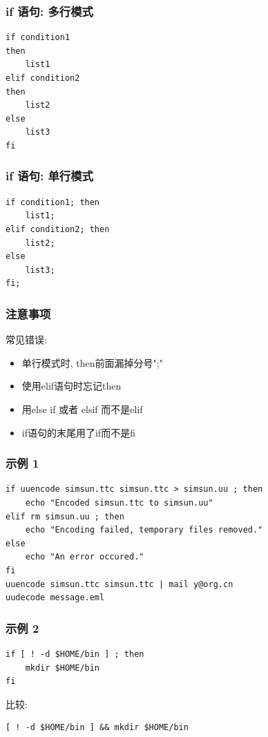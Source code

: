 \documentclass[compress]{beamer}
\begin{document}
\begin{frame}[fragile]
  \frametitle{if 语句: 多行模式}
\begin{Verbatim}
if condition1
then
    list1
elif condition2
then
    list2
else
    list3
fi
\end{Verbatim}
\end{frame}

\begin{frame}[fragile]
  \frametitle{if 语句: 单行模式}

\begin{Verbatim}
if condition1; then 
	list1; 
elif condition2; then 
	list2; 
else 
	list3; 
fi;
\end{Verbatim}
\end{frame}

\begin{frame}
\frametitle{注意事项}

常见错误:
\begin{itemize}
\item 单行模式时, then前面漏掉分号";"
\item 使用elif语句时忘记then
\item 用else if 或者 elsif 而不是elif
\item if语句的末尾用了if而不是fi
\end{itemize}

\end{frame}

\begin{frame}[fragile]
\frametitle{示例 1}

\begin{lstlisting}
if uuencode simsun.ttc simsun.ttc > simsun.uu ; then
    echo "Encoded simsun.ttc to simsun.uu"
elif rm simsun.uu ; then
    echo "Encoding failed, temporary files removed."
else
    echo "An error occured."
fi
uuencode simsun.ttc simsun.ttc | mail y@org.cn
uudecode message.eml
\end{lstlisting}
\end{frame}

\begin{frame}[fragile]
\frametitle{示例 2}

\begin{lstlisting}
if [ ! -d $HOME/bin ] ; then
    mkdir $HOME/bin
fi
\end{lstlisting} 
\pause
比较:
\begin{lstlisting}
[ ! -d $HOME/bin ] && mkdir $HOME/bin
\end{lstlisting}
\end{frame}
\end{document}

